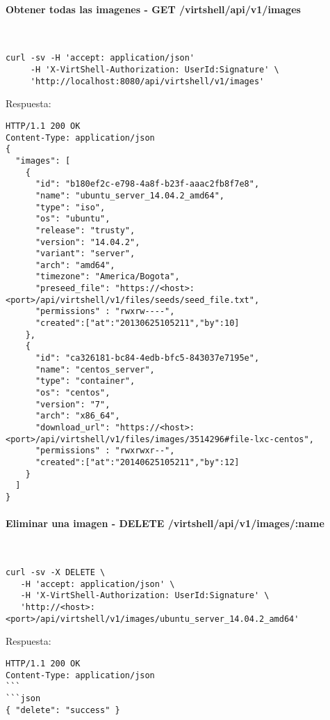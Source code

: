 \paragraph{Obtener todas las imagenes - GET /virtshell/api/v1/images} ~\\

\begin{lstlisting}[style=json]
curl -sv -H 'accept: application/json' 
     -H 'X-VirtShell-Authorization: UserId:Signature' \ 
     'http://localhost:8080/api/virtshell/v1/images'
\end{lstlisting}

\vspace{1cm}
Respuesta:
\vspace{1cm}

\begin{lstlisting}[style=json]
HTTP/1.1 200 OK
Content-Type: application/json
{
  "images": [
    {
      "id": "b180ef2c-e798-4a8f-b23f-aaac2fb8f7e8",
      "name": "ubuntu_server_14.04.2_amd64",
      "type": "iso",
      "os": "ubuntu", 
      "release": "trusty",
      "version": "14.04.2", 
      "variant": "server", 
      "arch": "amd64", 
      "timezone": "America/Bogota", 
      "preseed_file": "https://<host>:<port>/api/virtshell/v1/files/seeds/seed_file.txt",
      "permissions" : "rwxrw----",
      "created":["at":"20130625105211","by":10]
    },
    {
      "id": "ca326181-bc84-4edb-bfc5-843037e7195e",
      "name": "centos_server",
      "type": "container",
      "os": "centos", 
      "version": "7", 
      "arch": "x86_64", 
      "download_url": "https://<host>:<port>/api/virtshell/v1/files/images/3514296#file-lxc-centos",
      "permissions" : "rwxrwxr--",
      "created":["at":"20140625105211","by":12]
    }
  ]
}  
\end{lstlisting}

\paragraph{Eliminar una imagen - DELETE /virtshell/api/v1/images/:name} ~\\

\begin{lstlisting}[style=json]
curl -sv -X DELETE \
   -H 'accept: application/json' \
   -H 'X-VirtShell-Authorization: UserId:Signature' \
   'http://<host>:<port>/api/virtshell/v1/images/ubuntu_server_14.04.2_amd64'
\end{lstlisting}

\vspace{1cm}
Respuesta:
\vspace{1cm}

\begin{lstlisting}[style=json]
HTTP/1.1 200 OK
Content-Type: application/json
```
```json
{ "delete": "success" }
\end{lstlisting}
